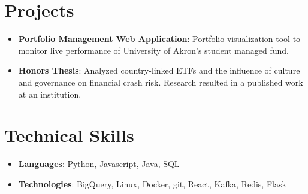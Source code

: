 \documentclass[letterpaper,11pt]{article}
\newcommand{\resumeItem}[2]{
  \item\small{
    \textbf{#1}{: #2 \vspace{-2pt}}
  }
}
\newcommand{\resumeSubItem}[2]{\resumeItem{#1}{#2}\vspace{-4pt}}
\newcommand{\resumeSubHeadingListStart}{\begin{itemize}[leftmargin=*]}
\newcommand{\resumeSubHeadingListEnd}{\end{itemize}}
\begin{document}
\section{Projects}
  \resumeSubHeadingListStart
    \resumeSubItem{Portfolio Management Web Application}
      {Portfolio visualization tool to monitor live performance of University of Akron's student managed fund.}
    \resumeSubItem{Honors Thesis}
      {Analyzed country-linked ETFs and the influence of culture and governance on financial crash risk. Research resulted in a published work at an institution.}
  \resumeSubHeadingListEnd


\section{Technical Skills}
  \resumeSubHeadingListStart
    \item{
            \textbf{Languages}{: Python, Javascript, Java, SQL}
      \hfill
    }
\item {
      \textbf{Technologies}{: BigQuery, Linux, Docker, git, React, Kafka, Redis, Flask}
}
  \resumeSubHeadingListEnd


\end{document}
